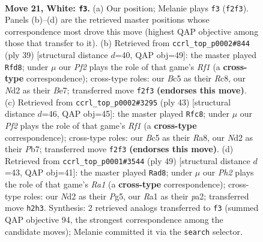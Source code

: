 \documentclass[11pt]{article}
\begin{document}
\clearpage

\begin{figure}[p]\centering
\begin{subfigure}{0.46\textwidth}\centering
\resizebox{\linewidth}{!}{%
\newchessgame
\chessboard[
  setfen={rn4kr/6b1/8/p1Bp2p1/3P3p/8/P2N1PPP/R4RK1 w - - 0 21},
  showmover=false,
  pgfstyle=straightmove, color=movearrow, markmove={f2-f3}
]}
\caption{}
\end{subfigure}\hfill
\begin{subfigure}{0.46\textwidth}\centering
\resizebox{\linewidth}{!}{%
\newchessgame
\chessboard[
  setfen={2r2rk1/4bppp/p7/4Pp2/2pB1P2/8/PP3KPP/2R2R2 b - - 1 20},
  showmover=false,
  pgfstyle=straightmove, color=movearrow, markmove={f8-d8}
]}
\caption{}
\end{subfigure}
\\[4pt]
\begin{subfigure}{0.46\textwidth}\centering
\resizebox{\linewidth}{!}{%
\newchessgame
\chessboard[
  setfen={r4rk1/1p1n2pp/p7/3p1p2/1P1P4/R7/1P1BPP1P/R5K1 b - - 0 22},
  showmover=false,
  pgfstyle=straightmove, color=movearrow, markmove={f8-c8}
]}
\caption{}
\end{subfigure}\hfill
\begin{subfigure}{0.46\textwidth}\centering
\resizebox{\linewidth}{!}{%
\newchessgame
\chessboard[
  setfen={r4rk1/1p5p/p5b1/5pp1/8/3B1P2/PP3KPP/2RR4 b - - 1 25},
  showmover=false,
  pgfstyle=straightmove, color=movearrow, markmove={a8-d8}
]}
\caption{}
\end{subfigure}
\caption{\textbf{Move 21, White: \texttt{f3}.} (a) Our position; Melanie plays \texttt{f3} (\texttt{f2f3}). Panels (b)--(d) are the retrieved master positions whose correspondence most drove this move (highest QAP objective among those that transfer to it). (b) Retrieved from \texttt{ccrl\_top\_p0002\#844} (ply 39) [structural distance $d$=40, QAP obj=49]: the master played \texttt{Rfd8}; under $\mu$ our \emph{Pf2} plays the role of that game's \emph{Rf1} (a \textbf{cross-type} correspondence); cross-type roles: our \emph{B}c5 as their \emph{R}c8, our \emph{N}d2 as their \emph{B}e7; transferred move \texttt{f2f3} \textbf{(endorses this move)}. (c) Retrieved from \texttt{ccrl\_top\_p0002\#3295} (ply 43) [structural distance $d$=46, QAP obj=45]: the master played \texttt{Rfc8}; under $\mu$ our \emph{Pf2} plays the role of that game's \emph{Rf1} (a \textbf{cross-type} correspondence); cross-type roles: our \emph{B}c5 as their \emph{R}a8, our \emph{N}d2 as their \emph{P}b7; transferred move \texttt{f2f3} \textbf{(endorses this move)}. (d) Retrieved from \texttt{ccrl\_top\_p0001\#3544} (ply 49) [structural distance $d$=43, QAP obj=41]: the master played \texttt{Rad8}; under $\mu$ our \emph{Ph2} plays the role of that game's \emph{Ra1} (a \textbf{cross-type} correspondence); cross-type roles: our \emph{N}d2 as their \emph{P}g5, our \emph{R}a1 as their \emph{p}a2; transferred move \texttt{h2h3}. Synthesis: 2 retrieved analogs transferred to \texttt{f3} (summed QAP objective 94, the strongest correspondence among the candidate moves); Melanie committed it via the \texttt{search} selector.}
\label{fig:thought-m40}
\end{figure}
\end{document}
